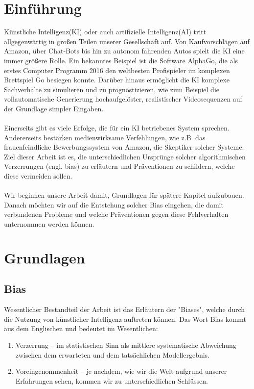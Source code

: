 \documentclass[12pt,oneside,a4paper,parskip]{scrbook}
\begin{document}
\chapter{Einführung}
\label{chapter:intro}
Künstliche Intelligenz(KI) oder auch artifizielle Intelligenz(AI) tritt allgegenwärtig in großen Teilen unserer Gesellschaft auf. Von Kaufvorschlägen auf Amazon, über Chat-Bots bis hin zu autonom fahrenden Autos spielt die KI eine immer größere Rolle. Ein bekanntes Beispiel ist die Software AlphaGo, die als erstes Computer Programm 2016 den weltbesten Profispieler im komplexen Brettspiel Go besiegen konnte\cite{alphaGo}. Darüber hinaus ermöglicht die KI komplexe Sachverhalte zu simulieren und zu prognostizieren, wie zum Beispiel die vollautomatische Generierung hochaufgelöster, realistischer Videosequenzen auf der Grundlage simpler Eingaben\cite{videoToVideo}.
\\\\
Einerseits gibt es viele Erfolge, die für ein KI betriebenes System sprechen. Andererseits bestärken medienwirksame Verfehlungen, wie z.B. das frauenfeindliche Bewerbungssystem von Amazon\cite{amazon}, die Skeptiker solcher Systeme. Ziel dieser Arbeit ist es, die unterschiedlichen Ursprünge solcher algorithmischen Verzerrungen (engl. bias) zu erläutern und Präventionen zu schildern, welche diese vermeiden sollen.
\\\\
Wir beginnen unsere Arbeit damit, Grundlagen für spätere Kapitel aufzubauen. Danach möchten wir auf die Entstehung solcher Bias eingehen, die damit verbundenen Probleme und welche Präventionen gegen diese Fehlverhalten unternommen werden können.
\chapter{Grundlagen}
\section{Bias}
Wesentlicher Bestandteil der Arbeit ist das Erläutern der "Biases", welche durch die Nutzung von künstlicher Intelligenz auftreten können. Das Wort Bias kommt aus dem Englischen und bedeutet im Wesentlichen:
\begin{enumerate}
	\item Verzerrung – im statistischen Sinn als mittlere systematische Abweichung zwischen dem erwarteten und dem tatsächlichen Modellergebnis. 
	\item Voreingenommenheit – je nachdem, wie wir die Welt aufgrund unserer Erfahrungen sehen, kommen wir zu unterschiedlichen Schlüssen\cite{biasEffekt}. %
\end{enumerate}
\end{document}

